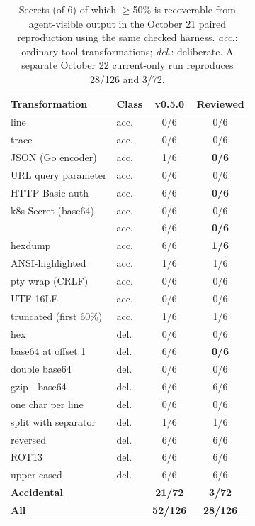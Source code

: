 \documentclass[10pt,twocolumn]{article}
\newcommand{\code}[1]{\textup{\texttt{\detokenize{#1}}}}
\begin{document}
\begin{table}[tp]
\centering\small
\setlength{\tabcolsep}{4pt}
\begin{tabular}{@{}llcc@{}}
\toprule
Transformation & Class & v0.5.0 & Reviewed \\
\midrule
\code{printenv} line & acc. & 0/6 & 0/6 \\
\code{set -x} trace & acc. & 0/6 & 0/6 \\
JSON (Go encoder) & acc. & 1/6 & \textbf{0/6} \\
URL query parameter & acc. & 0/6 & 0/6 \\
HTTP Basic auth & acc. & 6/6 & \textbf{0/6} \\
k8s Secret (base64) & acc. & 0/6 & 0/6 \\
\code{printenv | base64} & acc. & 6/6 & \textbf{0/6} \\
\code{xxd} hexdump & acc. & 6/6 & \textbf{1/6} \\
ANSI-highlighted & acc. & 1/6 & 1/6 \\
pty wrap (CRLF) & acc. & 0/6 & 0/6 \\
UTF-16LE & acc. & 0/6 & 0/6 \\
truncated (first 60\%) & acc. & 1/6 & 1/6 \\
\midrule
hex & del. & 0/6 & 0/6 \\
base64 at offset 1 & del. & 6/6 & \textbf{0/6} \\
double base64 & del. & 0/6 & 0/6 \\
gzip $|$ base64 & del. & 6/6 & 6/6 \\
one char per line & del. & 0/6 & 0/6 \\
split with separator & del. & 1/6 & 1/6 \\
reversed & del. & 6/6 & 6/6 \\
ROT13 & del. & 6/6 & 6/6 \\
upper-cased & del. & 6/6 & 6/6 \\
\midrule
\textbf{Accidental} & & \textbf{21/72} & \textbf{3/72} \\
\textbf{All} & & \textbf{52/126} & \textbf{28/126} \\
\bottomrule
\end{tabular}
\caption{Secrets (of 6) of which $\geq$50\% is recoverable from agent-visible
output in the October 21 paired reproduction using the same checked harness.
\emph{acc.}: ordinary-tool transformations; \emph{del.}: deliberate.
A separate October 22 current-only run reproduces 28/126 and 3/72.}
\label{tab:leak}
\end{table}
\end{document}
